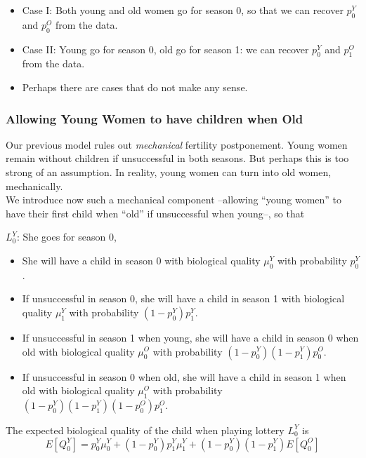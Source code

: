 \documentclass[a4paper, 11 pt]{article}
\theoremstyle{plain}
\begin{document}
\begin{spacing}{1.2}
\begin{itemize}
  \item Case I: Both young and old women go for season 0, so that we can recover $p_0^{Y}$ and $p_0^{O}$ from the data.
  \item Case II: Young go for season 0, old go for season 1: we can recover $p_0^{Y}$ and $p_1^{O}$ from the data.
  \item Perhaps there are cases that do not make any sense.
\end{itemize}





\clearpage
\subsubsection{Allowing Young Women to have children when Old}
Our previous model rules out \emph{mechanical} fertility postponement. Young women remain without children if unsuccessful in both seasons. But perhaps this is too strong of an assumption. In reality, young women can turn into old women, mechanically.\\

We introduce now such a mechanical component --allowing ``young women'' to have their first child when ``old'' if unsuccessful when young--, so that

$L_0^{Y}$: She goes for season 0,
\begin{itemize}
  \item She will have a child in season 0 with biological quality $\mu_0^{Y}$ with probability $p_0^{Y}$.
  \item If unsuccessful in season 0, she will have a child in season 1 with biological quality $\mu_1^{Y}$ with probability $(1-p_0^{Y})p_1^{Y}$.
  \item If unsuccessful in season 1 when young, she will have a child in season 0 when old with biological quality $\mu_0^{O}$ with probability $(1-p_0^{Y})(1-p_1^{Y})p_0^{O}$.
  \item If unsuccessful in season 0 when old, she will have a child in season 1 when old with biological quality $\mu_1^{O}$ with probability $(1-p_0^{Y})(1-p_1^{Y})(1-p_0^{O})p_1^{O}$.
\end{itemize}
The expected biological quality of the child when playing lottery $L_0^{Y}$ is
\begin{equation}\label{A8}
    E[Q_0^{Y}]=p_0^{Y} \mu_0^{Y} + (1 - p_0^{Y})p_1^{Y} \mu_1^{Y} + (1 - p_0^{Y})(1-p_1^{Y})E[Q_0^{O}]
\end{equation}



\end{spacing}
\end{document}
